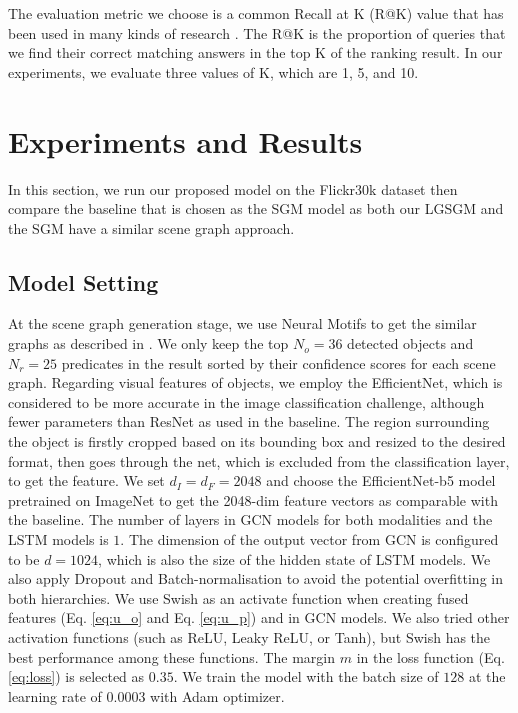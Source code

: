 \documentclass{IOS-Book-Article}
\begin{document}
The evaluation metric we choose is a common Recall at K (R@K) value that has been used in many kinds of research \cite{wang2020cross,wang2019position,chen2020imram,wei2020multi}. The R@K is the proportion of queries that we find their correct matching answers in the top K of the ranking result. In our experiments, we evaluate three values of K, which are 1, 5, and 10.

\section{Experiments and Results}
In this section, we run our proposed model on the Flickr30k dataset then compare the baseline that is chosen as the SGM model as both our LGSGM and the SGM have a similar scene graph approach.

\subsection{Model Setting}
At the scene graph generation stage, we use Neural Motifs \cite{motifnet} 
to get the similar graphs as described in \cite{wang2020cross}. We only keep the top $N_o=36$ detected objects and $N_r=25$ predicates in the result sorted by their confidence scores for each scene graph. Regarding visual features of objects, we employ the EfficientNet, which is considered to be more accurate in the image classification challenge, although fewer parameters \cite{tan2019efficientnet} than ResNet \cite{he2016deep} as used in the baseline. The region surrounding the object is firstly cropped based on its bounding box and resized to the desired format, then goes through the net, which is excluded from the classification layer, to get the feature. We set $d_I=d_F=2048$ and choose the EfficientNet-b5 model pretrained on ImageNet to get the 2048-dim feature vectors as comparable with the baseline. The number of layers in GCN models for both modalities and the LSTM models is $1$. The dimension of the output vector from GCN is configured to be $d=1024$, which is also the size of the hidden state of LSTM models. We also apply Dropout and Batch-normalisation to avoid the potential overfitting in both hierarchies. We use Swish \cite{ramachandran2017searching} as an activate function when creating fused features (Eq. \ref{eq:u_o} and Eq. \ref{eq:u_p}) and in GCN models. We also tried other activation functions (such as ReLU, Leaky ReLU, or Tanh), but Swish has the best performance among these functions. The margin $m$ in the loss function (Eq. \ref{eq:loss}) is selected as $0.35$. We train the model with the batch size of $128$ at the learning rate of $0.0003$ with Adam optimizer. 
\end{document}
